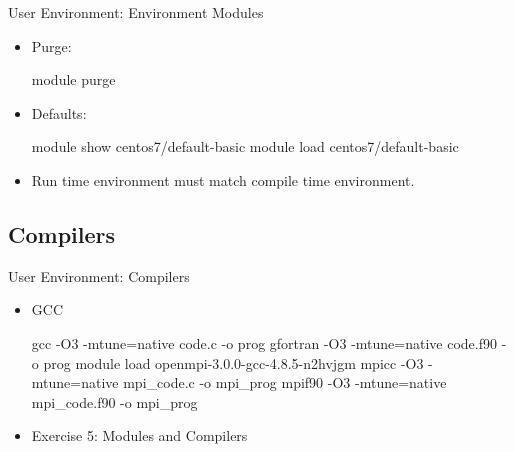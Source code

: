\begin{frame}[fragile]{User Environment: Environment Modules}
\begin{itemize}
\item{Purge:}
\begin{semiverbatim}
\scriptsize
module purge
\end{semiverbatim}
\smallskip
\item{Defaults:}
\begin{semiverbatim}
\scriptsize
module show centos7/default-basic
module load centos7/default-basic
\end{semiverbatim}
\medskip
\item{Run time environment must match compile time environment.}
\end{itemize}
\end{frame}

\subsection{Compilers}
\begin{frame}[fragile]{User Environment: Compilers}
  \begin{itemize}
    \item{GCC}
\begin{semiverbatim}
\scriptsize
gcc -O3 -mtune=native code.c -o prog
gfortran -O3 -mtune=native code.f90 -o prog
\medskip
module load openmpi-3.0.0-gcc-4.8.5-n2hvjgm
mpicc -O3 -mtune=native mpi_code.c -o mpi_prog
mpif90 -O3 -mtune=native mpi_code.f90 -o mpi_prog
\end{semiverbatim}
\pause
\item{Exercise 5: Modules and Compilers}
\end{itemize}
\end{frame}




